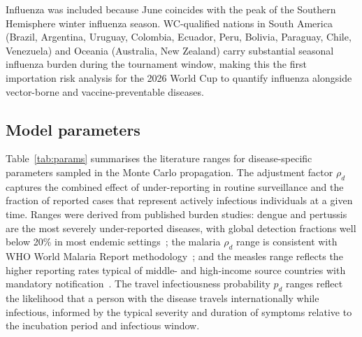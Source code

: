 \documentclass[12pt]{article}
\begin{document}
Influenza was included because June coincides with the peak of the
Southern Hemisphere winter influenza season. WC-qualified nations in
South America (Brazil, Argentina, Uruguay, Colombia, Ecuador, Peru,
Bolivia, Paraguay, Chile, Venezuela) and Oceania (Australia, New
Zealand) carry substantial seasonal influenza burden during the
tournament window, making this the first importation risk analysis for
the 2026 World Cup to quantify influenza alongside vector-borne and
vaccine-preventable diseases.

\subsection*{Model parameters}

Table~\ref{tab:params} summarises the literature ranges for
disease-specific parameters sampled in the Monte Carlo propagation.
The adjustment factor $\rho_d$ captures the combined effect of
under-reporting in routine surveillance and the fraction of reported
cases that represent actively infectious individuals at a given time.
Ranges were derived from published burden studies: dengue and
pertussis are the most severely under-reported diseases, with global
detection fractions well below 20\% in most endemic
settings~\cite{bhatt2013,undurraga2013,mclaughlin2016}; the malaria
$\rho_d$ range is consistent with WHO World Malaria Report
methodology~\cite{whoWMR2024}; and the measles range reflects the
higher reporting rates typical of middle- and high-income source
countries with mandatory notification~\cite{simons2012}.
The travel infectiousness probability $p_d$ ranges reflect the
likelihood that a person with the disease travels internationally
while infectious, informed by the typical severity and duration of
symptoms relative to the incubation period and infectious window.
\end{document}
